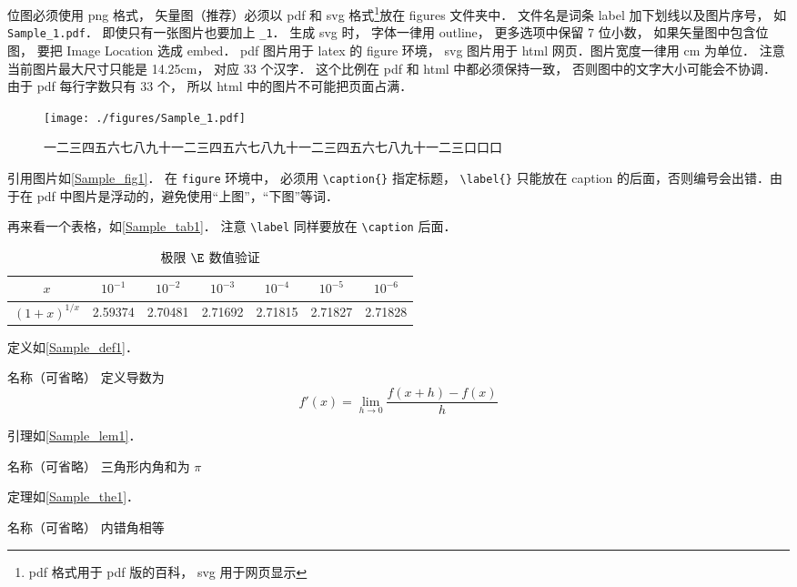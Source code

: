 位图必须使用 png 格式， 矢量图（推荐）必须以 pdf 和 svg 格式\footnote{pdf 格式用于 pdf 版的百科， svg 用于网页显示}放在 figures 文件夹中． 文件名是词条 label 加下划线以及图片序号， 如 \verb|Sample_1.pdf|． 即使只有一张图片也要加上 \verb|_1|． 生成 svg 时， 字体一律用 outline， 更多选项中保留 7 位小数， 如果矢量图中包含位图， 要把 Image Location 选成 embed． pdf 图片用于 latex 的 figure 环境， svg 图片用于 html 网页．图片宽度一律用 cm 为单位． 注意当前图片最大尺寸只能是 14.25cm， 对应 33 个汉字． 这个比例在 pdf 和 html 中都必须保持一致， 否则图中的文字大小可能会不协调． 由于 pdf 每行字数只有 33 个， 所以 html 中的图片不可能把页面占满．
\begin{figure}[ht]
\centering
\texttt{[image: ./figures/Sample\_1.pdf]}
\caption{一二三四五六七八九十一二三四五六七八九十一二三四五六七八九十一二三口口口} \label{Sample_fig1}
\end{figure}
引用图片如\autoref{Sample_fig1}． 在 \verb|figure| 环境中， 必须用 \verb|\caption{}| 指定标题， \verb|\label{}| 只能放在 caption 的后面，否则编号会出错．由于在 pdf 中图片是浮动的，避免使用“上图”，“下图”等词．

再来看一个表格，如\autoref{Sample_tab1}． 注意 \verb|\label| 同样要放在 \verb|\caption| 后面．
\begin{table}[ht]
\centering
\caption{极限 $\E$ 数值验证}\label{Sample_tab1}
\begin{tabular}{|c|c|c|c|c|c|c|}
\hline
$x$ & ${10^{ - 1}}$ & ${10^{ - 2}}$ & ${10^{ - 3}}$ & ${10^{ - 4}}$ & ${10^{ - 5}}$ & ${10^{ - 6}}$ \\
\hline
$(1 + x)^{1/x}$ & 2.59374 & 2.70481 & 2.71692 & 2.71815 & 2.71827 & 2.71828 \\
\hline
\end{tabular}
\end{table}

定义如\autoref{Sample_def1}．
\begin{definition}{名称（可省略）}\label{Sample_def1}
定义导数为
\begin{equation}
f'(x) = \lim_{h \to 0} \frac{f(x + h) - f(x)}{h}
\end{equation}
\end{definition}

引理如\autoref{Sample_lem1}．
\begin{lemma}{名称（可省略）}\label{Sample_lem1}
三角形内角和为 $\pi$
\end{lemma}

定理如\autoref{Sample_the1}．
\begin{theorem}{名称（可省略）}\label{Sample_the1}
内错角相等
\end{theorem}

